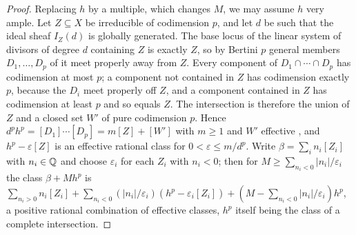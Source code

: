 \begin{proof}
Replacing $h$ by a multiple, which changes $M$, we may assume $h$ very ample.
Let $Z\subseteq X$ be irreducible of codimension $p$, and let $d$ be such that
the ideal sheaf $I_{Z}(d)$ is globally generated. The base locus of the linear
system of divisors of degree $d$ containing $Z$ is exactly $Z$, so by Bertini
$p$ general members $D_{1},\dots,D_{p}$ of it meet properly away from $Z$.
Every component of $D_{1}\cap\cdots\cap D_{p}$ has codimension at most $p$;
a component not contained in $Z$ has codimension exactly $p$, because the
$D_{i}$ meet properly off $Z$, and a component contained in $Z$ has
codimension at least $p$ and so equals $Z$. The intersection is therefore the
union of $Z$ and a closed set $W'$ of pure codimension $p$. Hence $d^{p}h^{p}=[D_{1}]\cdots[D_{p}]=m[Z]+[W']$ with $m\ge1$ and
$W'$ effective \cite[Chapter~7]{Ful98}, and $h^{p}-\varepsilon[Z]$ is an
effective rational class for $0<\varepsilon\le m/d^{p}$. Write
$\beta=\sum_{i}n_{i}[Z_{i}]$ with $n_{i}\in\mathbb{Q}$ and choose $\varepsilon_{i}$ for
each $Z_{i}$ with $n_{i}<0$; then for $M\ge\sum_{n_{i}<0}|n_{i}|/\varepsilon_{i}$
the class $\beta+Mh^{p}$ is $\sum_{n_{i}>0}n_{i}[Z_{i}]+\sum_{n_{i}<0}
(|n_{i}|/\varepsilon_{i})(h^{p}-\varepsilon_{i}[Z_{i}])+(M-\sum_{n_{i}<0}
|n_{i}|/\varepsilon_{i})h^{p}$, a positive rational combination of effective
classes, $h^{p}$ itself being the class of a complete intersection.
\end{proof}


